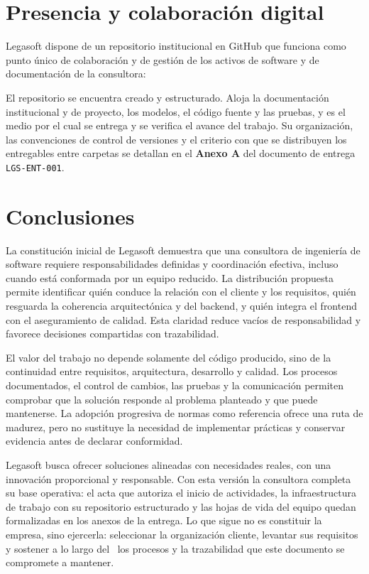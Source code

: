 \section{Presencia y colaboración digital}

Legasoft dispone de un repositorio institucional en GitHub que funciona como
punto único de colaboración y de gestión de los activos de software y de
documentación de la consultora:

\begin{nota}
\href{\lgRepo}{\lgRepoCorto}
\end{nota}

El repositorio se encuentra creado y estructurado. Aloja la documentación
institucional y de proyecto, los modelos, el código fuente y las pruebas, y es
el medio por el cual se entrega y se verifica el avance del trabajo. Su
organización, las convenciones de control de versiones y el criterio con que se
distribuyen los entregables entre carpetas se detallan en el \textbf{Anexo A}
del documento de entrega \texttt{LGS-ENT-001}.

\section{Conclusiones}

La constitución inicial de Legasoft demuestra que una consultora de ingeniería de
software requiere responsabilidades definidas y coordinación efectiva, incluso
cuando está conformada por un equipo reducido. La distribución propuesta permite
identificar quién conduce la relación con el cliente y los requisitos, quién
resguarda la coherencia arquitectónica y del backend, y quién integra el frontend
con el aseguramiento de calidad. Esta claridad reduce vacíos de responsabilidad y
favorece decisiones compartidas con trazabilidad.

El valor del trabajo no depende solamente del código producido, sino de la
continuidad entre requisitos, arquitectura, desarrollo y calidad. Los procesos
documentados, el control de cambios, las pruebas y la comunicación permiten
comprobar que la solución responde al problema planteado y que puede mantenerse.
La adopción progresiva de normas como referencia ofrece una ruta de madurez, pero
no sustituye la necesidad de implementar prácticas y conservar evidencia antes de
declarar conformidad.

Legasoft busca ofrecer soluciones alineadas con necesidades reales, con una
innovación proporcional y responsable. Con esta versión la consultora completa su
base operativa: el acta que autoriza el inicio de actividades, la infraestructura
de trabajo con su repositorio estructurado y las hojas de vida del equipo quedan
formalizadas en los anexos de la entrega. Lo que sigue no es constituir la
empresa, sino ejercerla: seleccionar la organización cliente, levantar sus
requisitos y sostener a lo largo del \lgSemestre\ los procesos y la trazabilidad
que este documento se compromete a mantener.
